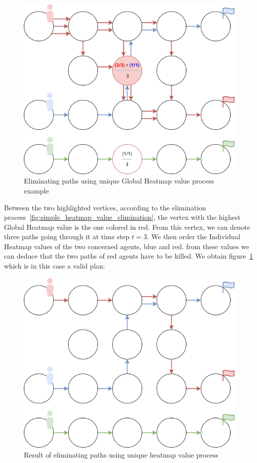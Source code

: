 \begin{figure}[H]
    \centering
    \caption{Eliminating paths using unique Global Heatmap value process example}\label{fig:simple_heatmap_value_elimination_example}
    \includegraphics[width=\widthimg]{img/pe_one_heatmap_value_example.drawio.png}
\end{figure}

Between the two highlighted vertices, according to the elimination process~\ref{fig:simple_heatmap_value_elimination}, the vertex with the highest Global Heatmap value is the one colored in red. From this vertex, we can denote three paths going through it at time step \(t=3\). We then order the Individual Heatmap values of the two concerned agents, blue and red. from these values we can deduce that the two paths of red agents have to be killed. We obtain figure~\ref{fig:simple_heatmap_value_elimination_example} which is in this case a valid plan:

\begin{figure}[H]
    \centering
    \caption{Result of eliminating paths using unique heatmap value process}\label{fig:simple_heatmap_value_elimination_example_result}
    \includegraphics[width=\widthimg]{img/pe_one_heatmap_value_example_result.drawio.png}
\end{figure}

